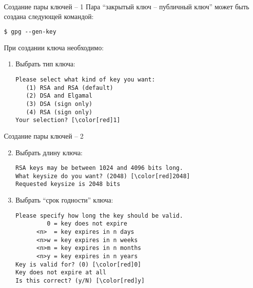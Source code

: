 \documentclass[presentation]{beamer}
\begin{document}
\begin{frame}[fragile]{Создание пары ключей -- 1}
  Пара ``закрытый ключ -- публичный ключ'' может быть создана
  следующей командой:
\begin{verbatim}
$ gpg --gen-key
\end{verbatim}
  При создании ключа необходимо:
  \begin{enumerate}
  \item Выбрать тип ключа:
\begin{Verbatim}[commandchars=\\\[\]]
Please select what kind of key you want:
   (1) RSA and RSA (default)
   (2) DSA and Elgamal
   (3) DSA (sign only)
   (4) RSA (sign only)
Your selection? [\color[red]1]
\end{Verbatim}
    \end{enumerate}
\end{frame}

\begin{frame}[fragile]{Создание пары ключей -- 2}
  \begin{enumerate}
    \setcounter{enumi}{1}
  \item Выбрать длину ключа:
\begin{Verbatim}[commandchars=\\\[\]]
RSA keys may be between 1024 and 4096 bits long.
What keysize do you want? (2048) [\color[red]2048]
Requested keysize is 2048 bits
\end{Verbatim}
  \item Выбрать ``срок годности'' ключа:
\begin{Verbatim}[commandchars=\\\[\]]
Please specify how long the key should be valid.
         0 = key does not expire
      <n>  = key expires in n days
      <n>w = key expires in n weeks
      <n>m = key expires in n months
      <n>y = key expires in n years
Key is valid for? (0) [\color[red]0]
Key does not expire at all
Is this correct? (y/N) [\color[red]y]
\end{Verbatim}
    \end{enumerate}
\end{frame}
\end{document}
